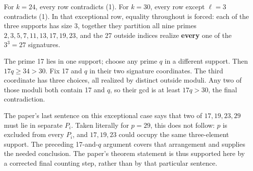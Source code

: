 \documentclass[11pt,a4paper]{article}
\begin{document}
For \(k=24\), every row contradicts (1). For \(k=30\), every row except \(\ell=3\) contradicts (1). In that exceptional row, equality throughout is forced: each of the three supports has size 3, together they partition all nine primes \(2,3,5,7,11,13,17,19,23\), and the 27 outside indices realize \textbf{every} one of the \(3^3=27\) signatures.

The prime 17 lies in one support; choose any prime \(q\) in a different support. Then \(17q\ge34>30\). Fix 17 and \(q\) in their two signature coordinates. The third coordinate has three choices, all realized by distinct outside moduli. Any two of those moduli both contain 17 and \(q\), so their gcd is at least \(17q>30\), the final contradiction.

The paper's last sentence on this exceptional case says that two of \(17,19,23,29\) must lie in separate \(P_i\). Taken literally for \(p=29\), this does not follow: \(p\) is excluded from every \(P_i\), and \(17,19,23\) could occupy the same three-element support. The preceding 17-and-\(q\) argument covers that arrangement and supplies the needed conclusion. The paper's theorem statement is thus supported here by a corrected final counting step, rather than by that particular sentence.
\end{document}
